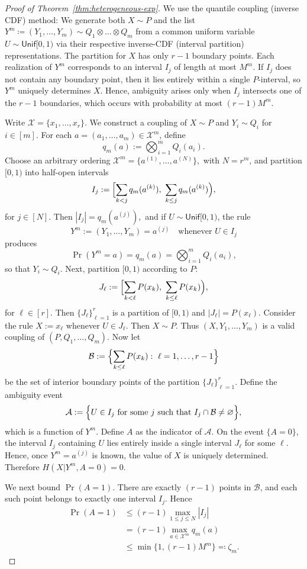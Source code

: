 \documentclass[journal]{IEEEtran}
\newcommand{\1}{\mathbf{1}}
\begin{document}
\begin{proof}[Proof of Theorem~\ref{thm:heterogeneous-exp}]
We use the quantile coupling (inverse CDF) method: 
We generate both $X\sim P$ and the list $Y^m\coloneqq (Y_1, \dots, Y_m)\sim Q_1\otimes \dots\otimes Q_m$ from a common uniform variable $U\sim \mathsf{Unif}[0,1)$ via their respective inverse-CDF (interval partition) representations. The partition for $X$ has only $r-1$ boundary points. Each realization of $Y^m$ corresponds to an interval $I_j$ of length at most $M^m$. If $I_j$ does not contain any boundary point, then it lies entirely within a single $P$-interval, so $Y^m$ uniquely determines $X$. Hence, ambiguity arises only when $I_j$ intersects one of the $r-1$ boundaries, which occurs with probability at most $(r-1)M^m$.

Write $\mathcal X=\{x_1,\dots,x_r\}.$ We construct a coupling of $X\sim P$ and $Y_i\sim Q_i$ for $i\in[m]$.  For each $a=(a_1,\dots,a_m)\in \mathcal X^m$, define
\[
q_m(a):=\bigotimes_{i=1}^m Q_i(a_i).
\]
Choose an arbitrary ordering $\mathcal X^m=\{a^{(1)},\dots,a^{(N)}\},$ with  $N=r^m$, and partition $[0,1)$ into half-open intervals
\[
I_j:=\Bigl[\sum_{k<j} q_m(a^{(k)}),\ \sum_{k\le j} q_m(a^{(k)})\Bigr),
\]
for $j\in[N]$. Then $|I_j|=q_m(a^{(j)}),$ and if $U\sim \mathsf{Unif}[0,1)$, the rule
\[
Y^m:=(Y_1,\dots,Y_m)=a^{(j)}
\quad\text{whenever }U\in I_j
\]
produces
\[
\Pr(Y^m=a)=q_m(a)=\bigotimes_{i=1}^m Q_i(a_i),
\]
so that $Y_i\sim Q_i$.  Next, partition $[0,1)$ according to $P$:
\[
J_\ell:=\Bigl[\sum_{k<\ell} P(x_k),\ \sum_{k\le \ell} P(x_k)\Bigr),
\]
for $\ell\in[r]$.
Then $\{J_\ell\}_{\ell=1}^r$ is a partition of $[0,1)$ and $|J_\ell|=P(x_\ell).$ Consider the rule $X:=x_\ell$ whenever  $U\in J_\ell$. 
Then $X\sim P$. Thus $(X,Y_1,\dots,Y_m)$ is a valid coupling of $(P,Q_1,\dots,Q_m)$.
Now let
\[
\mathcal B:=\Bigl\{\sum_{k\le \ell} P(x_k):\ \ell=1,\dots,r-1\Bigr\}
\]
be the set of interior boundary points of the partition $\{J_\ell\}_{\ell=1}^r$.
Define the ambiguity event
\[
\mathcal A:=\Bigl\{U\in I_j\text{ for some }j\text{ such that }I_j\cap \mathcal B\neq\varnothing\Bigr\},
\]
which is a function of $Y^m$. Define $A$ as the indicator of $\mathcal A$. 
On the event $\{A=0\}$, the interval $I_j$ containing $U$ lies entirely inside a
single interval $J_\ell$ for some $\ell$. Hence, once $Y^m=a^{(j)}$ is known, the value of $X$ is uniquely determined. Therefore
\(H(X| Y^m,A=0)=0.\)

We next bound $\Pr(A=1)$. There are exactly $(r-1)$ points in $\mathcal B$, and each such point belongs to exactly one interval $I_j$. Hence
\begin{align*}
    \Pr(A=1) &\le (r-1)\max_{1\le j\le N}|I_j|\\
    & = (r-1)\max_{a\in\mathcal X^m} q_m(a)\\
    & \leq \min\{1, (r-1) M^m\} \eqqcolon \zeta_m.
\end{align*}


\end{proof}
\end{document}
